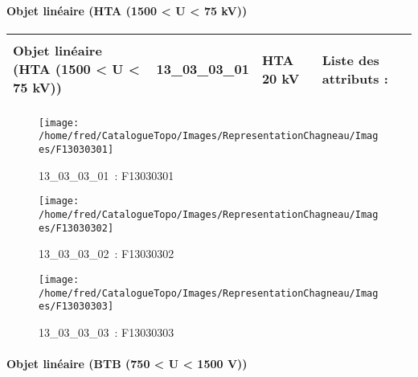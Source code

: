 \documentclass[12pt,titlepage,oneside]{book}
\begin{document}
\paragraph{Objet linéaire (HTA (1500 < U < 75 kV))}
\noindent
\vspace{\baselineskip}

\renewcommand{\arraystretch}{1.2}
\begin{supertabular}{|p{10cm}|c|p{13cm}|p{12cm}|}
 Objet linéaire (HTA (1500 < U < 75 kV)) & 13\_03\_03\_01 & HTA 20 kV & Liste des attributs :
\begin{enumerate}
\end{enumerate}
\\
\hline
\end{supertabular}
\begin{figure}[h!]
  \hfill         %
  \begin{minipage}[t]{3cm}
    \begin{center}
      \texttt{[image: /home/fred/CatalogueTopo/Images/RepresentationChagneau/Images/F13030301]}
      \caption[~13\_03\_03\_01]{\small{13\_03\_03\_01~:} \tiny{F13030301}}\label{F13030301}
    \end{center}
  \end{minipage}
  \begin{minipage}[t]{3cm}
    \begin{center}
      \texttt{[image: /home/fred/CatalogueTopo/Images/RepresentationChagneau/Images/F13030302]}
      \caption[~13\_03\_03\_02]{\small{13\_03\_03\_02~:} \tiny{F13030302}}\label{F13030302}
    \end{center}
  \end{minipage}
  \begin{minipage}[t]{3cm}
    \begin{center}
      \texttt{[image: /home/fred/CatalogueTopo/Images/RepresentationChagneau/Images/F13030303]}
      \caption[~13\_03\_03\_03]{\small{13\_03\_03\_03~:} \tiny{F13030303}}\label{F13030303}
    \end{center}
  \end{minipage}
\end{figure}


\paragraph{Objet linéaire (BTB (750 < U < 1500 V))}
\noindent
\vspace{\baselineskip}
\end{document}
